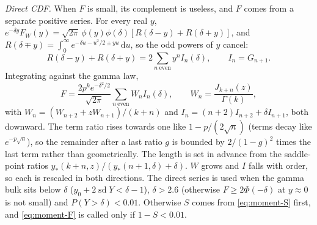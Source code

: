 \documentclass[12pt]{article}
\newcommand{\dd}{\,\mathrm{d}}
\newcommand{\PhiN}{\Phi}
\newcommand{\phiN}{\phi}
\begin{document}
\emph{Direct CDF.} When $F$ is small, its complement is useless, and $F$ comes from a separate positive series. For every real $y$, $e^{-\delta y}F_W(y)=\sqrt{2\pi}\,\phiN(y)\phiN(\delta)[R(\delta-y)+R(\delta+y)]$, and $R(\delta\mp y)=\int_0^\infty e^{-\delta u-u^2/2\pm yu}\dd u$, so the odd powers of $y$ cancel:
\begin{equation}
  R(\delta-y)+R(\delta+y)=2\sum_{n\ \mathrm{even}}y^nI_n(\delta),\qquad I_n=G_{n+1}.
\end{equation}
Integrating against the gamma law,
\begin{equation}
  F=\frac{2p^ke^{-\delta^2/2}}{\sqrt{2\pi}}\sum_{n\ \mathrm{even}}W_nI_n(\delta),
  \qquad W_n=\frac{J_{k+n}(z)}{\Gamma(k)},
  \label{eq:moment-F}
\end{equation}
with $W_n=(W_{n+2}+zW_{n+1})/(k+n)$ and $I_n=(n+2)I_{n+2}+\delta I_{n+1}$, both downward. The term ratio rises towards one like $1-p/(2\sqrt n)$ (terms decay like $e^{-p\sqrt n}$), so the remainder after a last ratio $g$ is bounded by $2/(1-g)^2$ times the last term rather than geometrically. The length is set in advance from the saddle-point ratios $y_\ast(k+n,z)/(y_\ast(n+1,\delta)+\delta)$. $W$ grows and $I$ falls with order, so each is rescaled in both directions. The direct series is used when the gamma bulk sits below $\delta$ ($y_0+2\operatorname{sd}Y<\delta-1$), $\delta>2.6$ (otherwise $F\ge2\PhiN(-\delta)$ at $y\approx0$ is not small) and $P(Y>\delta)<0.01$. Otherwise $S$ comes from \eqref{eq:moment-S} first, and \eqref{eq:moment-F} is called only if $1-S<0.01$.
\end{document}
